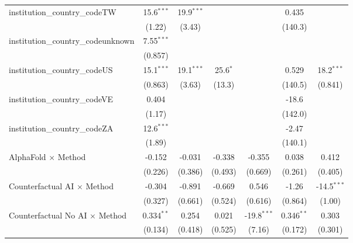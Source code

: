 \begin{tabular}{lcccccc}
   institution\_country\_codeTW          & 15.6$^{***}$  & 19.9$^{***}$ &              &               & 0.435         &   \\   
                                         & (1.22)        & (3.43)       &              &               & (140.3)       &   \\   
   institution\_country\_codeunknown     & 7.55$^{***}$  &              &              &               &               &   \\   
                                         & (0.857)       &              &              &               &               &   \\   
   institution\_country\_codeUS          & 15.1$^{***}$  & 19.1$^{***}$ & 25.6$^{*}$   &               & 0.529         & 18.2$^{***}$\\   
                                         & (0.863)       & (3.63)       & (13.3)       &               & (140.5)       & (0.841)\\   
   institution\_country\_codeVE          & 0.404         &              &              &               & -18.6         &   \\   
                                         & (1.17)        &              &              &               & (142.0)       &   \\   
   institution\_country\_codeZA          & 12.6$^{***}$  &              &              &               & -2.47         &   \\   
                                         & (1.89)        &              &              &               & (140.1)       &   \\   
   AlphaFold $\times$ Method             & -0.152        & -0.031       & -0.338       & -0.355        & 0.038         & 0.412\\   
                                         & (0.226)       & (0.386)      & (0.493)      & (0.669)       & (0.261)       & (0.405)\\   
   Counterfactual AI $\times$ Method     & -0.304        & -0.891       & -0.669       & 0.546         & -1.26         & -14.5$^{***}$\\   
                                         & (0.327)       & (0.661)      & (0.524)      & (0.616)       & (0.864)       & (1.00)\\   
   Counterfactual No AI $\times$ Method  & 0.334$^{**}$  & 0.254        & 0.021        & -19.8$^{***}$ & 0.346$^{**}$  & 0.303\\   
                                         & (0.134)       & (0.418)      & (0.525)      & (7.16)        & (0.172)       & (0.301)\\   

\end{tabular}
